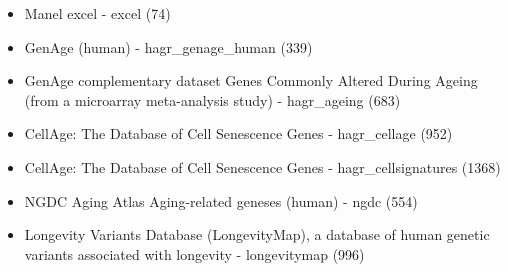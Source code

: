 \documentclass{article}\usepackage[]{graphicx}\usepackage[dvipsnames]{xcolor}
\begin{document}
\begin{itemize}
\item Manel excel - excel (74)
\item  GenAge (human) - hagr\_genage\_human (339) %
\item GenAge complementary dataset Genes Commonly Altered During Ageing (from a microarray meta-analysis study) - hagr\_ageing (683) %
\item CellAge: The Database of Cell Senescence Genes - hagr\_cellage (952) %
\item CellAge: The Database of Cell Senescence Genes - hagr\_cellsignatures (1368) %
\item NGDC Aging Atlas Aging-related geneses (human) - ngdc (554) %
\item Longevity Variants Database (LongevityMap), a database of human genetic variants associated with longevity - longevitymap (996) %
\end{itemize}
\end{document}

